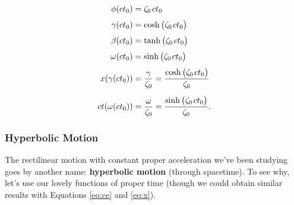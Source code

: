 \documentclass[12pt]{article}
\begin{document}
\begin{equation}\label{eq:idealhyperbolic}
\begin{aligned}
\phi (ct_0) &= \zeta_0 \mkern2mu ct_0 \\[3pt]
\gamma (ct_0) &= \cosh \big( \zeta_0 \mkern2mu ct_0 \big) \\[3pt]
\beta (ct_0) &= \tanh \big( \zeta_0 \mkern2mu ct_0 \big) \\[3pt]
\omega (ct_0) &= \sinh \big( \zeta_0 \mkern2mu ct_0 \big) \\[3pt]
x(\gamma(ct_0)) &= \dfrac{\gamma}{ \zeta_0 } = \dfrac{\cosh \big( \zeta_0 \mkern2mu ct_0 \big)}{ \zeta_0 } \\[5pt]
ct(\omega(ct_0)) &= \dfrac{\omega}{ \zeta_0} = \dfrac{\sinh \big( \zeta_0 \mkern2mu ct_0 \big)}{ \zeta_0 }.
\end{aligned}
\end{equation}



\subsubsection{Hyperbolic Motion}\label{sssec:hyperbolic}

The rectilinear motion with constant proper acceleration we've been studying goes by another name: \textbf{hyperbolic motion} (through spacetime). To see why, let's use our lovely functions of proper time (though we could obtain similar results with Equations \ref{eq:ce} and \ref{eq:x}).
\end{document}
